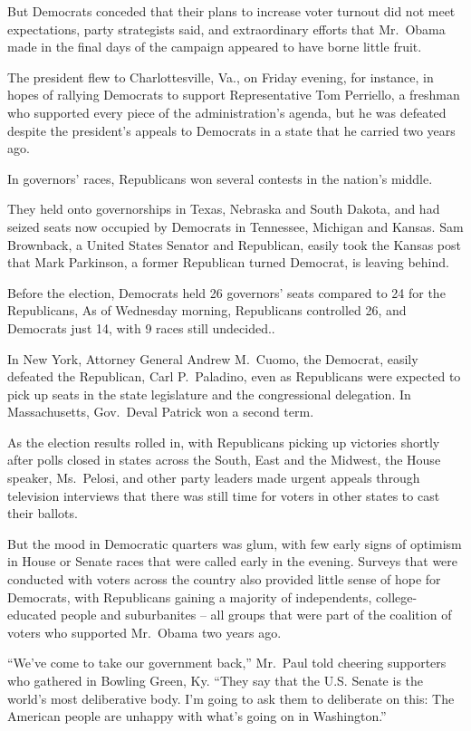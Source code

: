 ﻿\documentclass[12pt]{article}
\begin{document}
But Democrats conceded that their plans to increase voter turnout did not meet expectations, party
strategists said, and extraordinary efforts that Mr.~Obama made in the final days of the campaign
appeared to have borne little fruit.

The president flew to Charlottesville, Va., on Friday evening, for instance, in hopes of rallying
Democrats to support Representative Tom Perriello, a freshman who supported every piece of the
administration's agenda, but he was defeated despite the president's appeals to Democrats in a state
that he carried two years ago.

In governors' races, Republicans won several contests in the nation's middle.

They held onto governorships in Texas, Nebraska and South Dakota, and had seized seats now occupied
by Democrats in Tennessee, Michigan and Kansas. Sam Brownback, a United States Senator and
Republican, easily took the Kansas post that Mark Parkinson, a former Republican turned Democrat, is
leaving behind.

Before the election, Democrats held 26 governors' seats compared to 24 for the Republicans, As of
Wednesday morning, Republicans controlled 26, and Democrats just 14, with 9 races still undecided..

In New York, Attorney General Andrew M.~Cuomo, the Democrat, easily defeated the Republican, Carl
P.~Paladino, even as Republicans were expected to pick up seats in the state legislature and the
congressional delegation. In Massachusetts, Gov.~Deval Patrick won a second term.

As the election results rolled in, with Republicans picking up victories shortly after polls closed
in states across the South, East and the Midwest, the House speaker, Ms.~Pelosi, and other party
leaders made urgent appeals through television interviews that there was still time for voters in
other states to cast their ballots.

But the mood in Democratic quarters was glum, with few early signs of optimism in House or Senate
races that were called early in the evening. Surveys that were conducted with voters across the
country also provided little sense of hope for Democrats, with Republicans gaining a majority of
independents, college-educated people and suburbanites -- all groups that were part of the coalition
of voters who supported Mr.~Obama two years ago.

``We've come to take our government back,'' Mr.~Paul told cheering supporters who gathered in
Bowling Green, Ky. ``They say that the U.S. Senate is the world's most deliberative body. I'm going
to ask them to deliberate on this: The American people are unhappy with what's going on in
Washington.''
\end{document}
